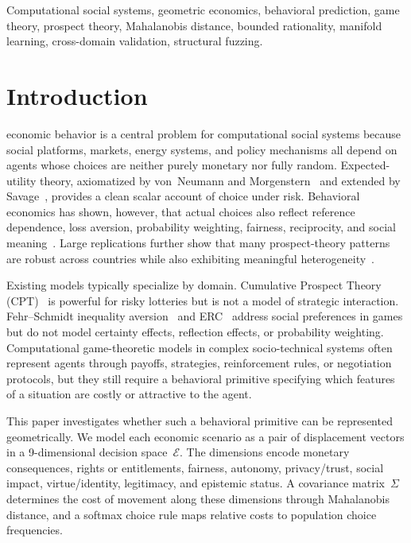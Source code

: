\documentclass[journal]{IEEEtran}
\newcommand{\E}{\mathcal{E}}               %
\begin{document}
\begin{IEEEkeywords}
Computational social systems, geometric economics, behavioral prediction, game theory, prospect theory, Mahalanobis distance, bounded rationality, manifold learning, cross-domain validation, structural fuzzing.
\end{IEEEkeywords}


\section{Introduction}
\label{sec:intro}

 economic behavior is a central problem for computational social systems because social platforms, markets, energy systems, and policy mechanisms all depend on agents whose choices are neither purely monetary nor fully random.
Expected-utility theory, axiomatized by von~Neumann and Morgenstern~\cite{vonneumann1944} and extended by Savage~\cite{savage1954}, provides a clean scalar account of choice under risk.
Behavioral economics has shown, however, that actual choices also reflect reference dependence, loss aversion, probability weighting, fairness, reciprocity, and social meaning~\cite{kahneman1979,tversky1992,fehr1999,bolton2000}.
Large replications further show that many prospect-theory patterns are robust across countries while also exhibiting meaningful heterogeneity~\cite{ruggeri2020,henrich2010}.

Existing models typically specialize by domain.
Cumulative Prospect Theory (CPT)~\cite{tversky1992} is powerful for risky lotteries but is not a model of strategic interaction.
Fehr--Schmidt inequality aversion~\cite{fehr1999} and ERC~\cite{bolton2000} address social preferences in games but do not model certainty effects, reflection effects, or probability weighting.
Computational game-theoretic models in complex socio-technical systems often represent agents through payoffs, strategies, reinforcement rules, or negotiation protocols, but they still require a behavioral primitive specifying which features of a situation are costly or attractive to the agent.

This paper investigates whether such a behavioral primitive can be represented geometrically.
We model each economic scenario as a pair of displacement vectors in a 9-dimensional decision space~$\E$.
The dimensions encode monetary consequences, rights or entitlements, fairness, autonomy, privacy/trust, social impact, virtue/identity, legitimacy, and epistemic status.
A covariance matrix~$\Sigma$ determines the cost of movement along these dimensions through Mahalanobis distance, and a softmax choice rule maps relative costs to population choice frequencies.
\end{document}
